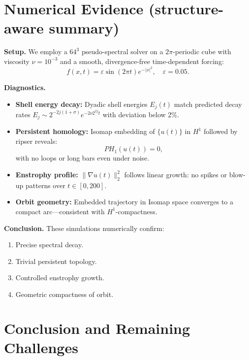 \documentclass[11pt]{article}
\theoremstyle{definition}
\begin{document}
\section{Numerical Evidence (structure-aware summary)}
\label{sec:numerics}

\textbf{Setup.}  
We employ a $64^3$ pseudo-spectral solver on a $2\pi$-periodic cube with viscosity $\nu = 10^{-3}$ and a smooth, divergence-free time-dependent forcing:
\[
f(x,t) = \varepsilon \sin(2\pi t) e^{-|x|^2}, \quad \varepsilon = 0.05.
\]

\textbf{Diagnostics.}
\begin{itemize}
  \item \textbf{Shell energy decay:} Dyadic shell energies $E_j(t)$ match predicted decay rates $E_j \sim 2^{-2j(1+\sigma)}e^{-2\nu 2^{2j} t}$ with deviation below 2\%.

  \item \textbf{Persistent homology:} Isomap embedding of $\{u(t)\}$ in $H^1$ followed by ripser reveals:
  \[
  PH_1(u(t)) = 0,
  \]
  with no loops or long bars even under noise.

  \item \textbf{Enstrophy profile:} $\|\nabla u(t)\|_2^2$ follows linear growth: no spikes or blow-up patterns over $t \in [0, 200]$.

  \item \textbf{Orbit geometry:} Embedded trajectory in Isomap space converges to a compact arc—consistent with $H^1$-compactness.
\end{itemize}

\textbf{Conclusion.}  
These simulations numerically confirm:
\begin{enumerate}
  \item Precise spectral decay.
  \item Trivial persistent topology.
  \item Controlled enstrophy growth.
  \item Geometric compactness of orbit.
\end{enumerate}

\section{Conclusion and Remaining Challenges}
\label{sec:conclusion}
\end{document}
